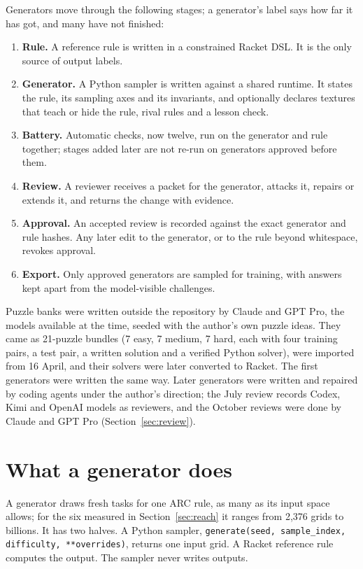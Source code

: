 \documentclass[11pt]{article}
\begin{document}
Generators move through the following stages; a generator's label says how far
it has got, and many have not finished:
\begin{enumerate}[nosep]
  \item \textbf{Rule.} A reference rule is written in a constrained Racket DSL. It is the only source of output labels.
  \item \textbf{Generator.} A Python sampler is written against a shared runtime. It states the rule, its sampling axes and its invariants, and optionally declares textures that teach or hide the rule, rival rules and a lesson check.
  \item \textbf{Battery.} Automatic checks, now twelve, run on the generator and rule together; stages added later are not re-run on generators approved before them.
  \item \textbf{Review.} A reviewer receives a packet for the generator, attacks it, repairs or extends it, and returns the change with evidence.
  \item \textbf{Approval.} An accepted review is recorded against the exact generator and rule hashes. Any later edit to the generator, or to the rule beyond whitespace, revokes approval.
  \item \textbf{Export.} Only approved generators are sampled for training, with answers kept apart from the model-visible challenges.
\end{enumerate}
Puzzle banks were written outside the repository by Claude and GPT Pro, the
models available at the time, seeded with the author's own puzzle ideas. They
came as 21-puzzle bundles (7 easy, 7 medium, 7 hard, each with four training
pairs, a test pair, a written solution and a verified Python solver), were
imported from 16 April, and their solvers were later converted to Racket. The
first generators were written the same way. Later generators were written and
repaired by coding agents under the author's direction; the July review records
Codex, Kimi and OpenAI models as reviewers, and the October reviews were done
by Claude and GPT Pro (Section~\ref{sec:review}).

\section{What a generator does}
\label{sec:generator}

A generator draws fresh tasks for one ARC rule, as many as its input space
allows; for the six measured in Section~\ref{sec:reach} it ranges from 2,376
grids to billions. It has
two halves. A Python sampler,
\texttt{generate(seed, sample\_index, difficulty, **overrides)}, returns one
input grid. A Racket reference rule computes the output. The sampler never
writes outputs.
\end{document}
